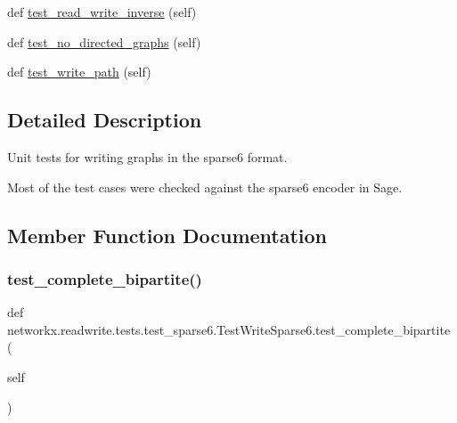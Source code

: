 \begin{DoxyCompactItemize}
\item 
def \hyperlink{classnetworkx_1_1readwrite_1_1tests_1_1test__sparse6_1_1TestWriteSparse6_ad9095c94f1daf1a9e60ce7568b72354a}{test\+\_\+read\+\_\+write\+\_\+inverse} (self)
\item 
def \hyperlink{classnetworkx_1_1readwrite_1_1tests_1_1test__sparse6_1_1TestWriteSparse6_addd8953b4544ca02bcf107d9c3b0840e}{test\+\_\+no\+\_\+directed\+\_\+graphs} (self)
\item 
def \hyperlink{classnetworkx_1_1readwrite_1_1tests_1_1test__sparse6_1_1TestWriteSparse6_a6b81a4a40797396f8549876880021b44}{test\+\_\+write\+\_\+path} (self)
\end{DoxyCompactItemize}


\subsection{Detailed Description}
\begin{DoxyVerb}Unit tests for writing graphs in the sparse6 format.

Most of the test cases were checked against the sparse6 encoder in Sage.\end{DoxyVerb}
 

\subsection{Member Function Documentation}
\mbox{\label{classnetworkx_1_1readwrite_1_1tests_1_1test__sparse6_1_1TestWriteSparse6_ae89995879e096dc39394b770cecb0384}} 
\subsubsection{\texorpdfstring{test\+\_\+complete\+\_\+bipartite()}{test\_complete\_bipartite()}}
{\footnotesize\ttfamily def networkx.\+readwrite.\+tests.\+test\+\_\+sparse6.\+Test\+Write\+Sparse6.\+test\+\_\+complete\+\_\+bipartite (\begin{DoxyParamCaption}\item[{}]{self }\end{DoxyParamCaption})}

